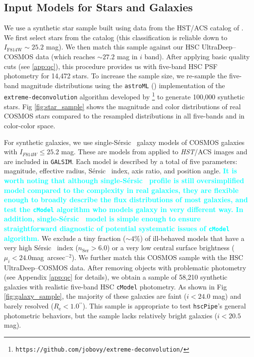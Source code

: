 \documentclass[useamsfonts]{pasj01}
\def\asec{$^{\prime\prime}$}
\def\sb{mag~arcsec$^{-2}$}
\def\ser{{S\'{e}rsic\ }}
\def\hscpipe{\texttt{hscPipe}}
\def\cmodel{\texttt{cModel}}
\def\galsim{\texttt{G}{\scriptsize \texttt{AL}}\texttt{S}{\scriptsize \texttt{IM}}}
\newcommand{\song}[1]{\textcolor{cyan} {\textbf{#1}}}
\begin{document}
\subsection{Input Models for Stars and Galaxies}
    \label{ssec:inputs}

    We use a synthetic star sample built using data from the HST/ACS catalog of 
    \citet{Leauthaud2007}.  
    We first select stars from the \citet{Leauthaud2007} catalog (this classification 
    is reliable down to $I_{\mathrm{F814W}}{\sim}25.2$ mag). 
    We then match this sample against our HSC UltraDeep--COSMOS data (which reaches 
    ${\sim}27.2$ mag in $i$ band). 
    After applying basic quality cuts (see \ref{app:qc}), this procedure provides us 
    with five-band HSC PSF photometry for 14,472 stars.
    To increase the sample size, we re-sample the five-band magnitude distributions 
    using the \texttt{astroML} (\citealt{astroml}) implementation of the 
    \texttt{extreme-deconvolution} algorithm developed by \citet{Bovy2011}
    \footnote{\texttt{https://github.com/jobovy/extreme-deconvolution/}} to
    generate 100,000 synthetic stars. 
    Fig \ref{fig:star_sample} shows the magnitude and color distributions of real 
    COSMOS stars compared to the resampled distributions in all five-bands and in 
    color-color space.

    For synthetic galaxies, we use single-\ser{} galaxy models of COSMOS galaxies with 
    $I_{F814W} \leq 25.2$ mag. 
    These are models from \citet{Lackner2012} applied to \textit{HST}/ACS images and 
    are included in \galsim{}. 
    Each model is described by a total of five parameters: magnitude, effective radius,
    \ser{} index, axis ratio, and position angle.
    \song{
    It is worth noting that although single-\ser{} profile is still oversimplified model 
    compared to the complexity in real galaxies, they are flexible enough to broadly 
    describe the flux distributions of most galaxies, and test the \cmodel{} algorithm 
    who models galaxy in very different way.
    In addition, single-\ser{} model is simple enough to ensure straightforward 
    diagnostic of potential systematic issues of \cmodel{} algorithm. 
    }
    We exclude a tiny fraction (${\sim}4$\%) of ill-behaved models that have a very 
    high \ser{} index ($n_{\mathrm{Ser}} > 6.0$) or a very low central surface 
    brightness ($\mu_{i} < 24.0$\sb).
    We further match this COSMOS sample with the HSC UltraDeep--COSMOS data.
    After removing objects with problematic photometry (see Appendix \ref{app:qc} for 
    details), we obtain a sample of 58,210 synthetic galaxies with realistic 
    five-band HSC \cmodel{} photometry.
    As shown in Fig \ref{fig:galaxy_sample}, the majority of these galaxies are
    faint ($i<24.0$ mag) and barely resolved ($R_{\mathrm{e}}< 1.0$\asec).
    This sample is appropriate to test \hscpipe{}'s general photometric behaviors, 
    but the sample lacks relatively bright galaxies ($i<20.5$ mag).
\end{document}
